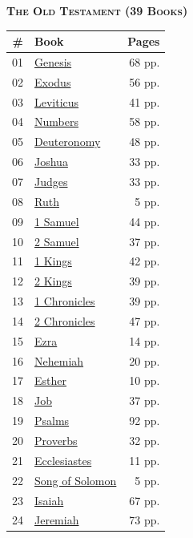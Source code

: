 \documentclass[10pt,letterpaper]{article}
\begin{document}
\begin{minipage}[t]{0.485\textwidth}
\centering
{\bfseries\scshape The Old Testament \footnotesize(39 Books)}\\[0.4em]
\begin{tabularx}{\linewidth}{r X r}
\toprule
\textbf{\#} & \textbf{Book} & \textbf{Pages} \\
\midrule
01 & \href{books/01_Genesis.pdf}{Genesis} & 68 pp. \\
02 & \href{books/02_Exodus.pdf}{Exodus} & 56 pp. \\
03 & \href{books/03_Leviticus.pdf}{Leviticus} & 41 pp. \\
04 & \href{books/04_Numbers.pdf}{Numbers} & 58 pp. \\
05 & \href{books/05_Deuteronomy.pdf}{Deuteronomy} & 48 pp. \\
06 & \href{books/06_Joshua.pdf}{Joshua} & 33 pp. \\
07 & \href{books/07_Judges.pdf}{Judges} & 33 pp. \\
08 & \href{books/08_Ruth.pdf}{Ruth} & 5 pp. \\
09 & \href{books/09_1_Samuel.pdf}{1 Samuel} & 44 pp. \\
10 & \href{books/10_2_Samuel.pdf}{2 Samuel} & 37 pp. \\
11 & \href{books/11_1_Kings.pdf}{1 Kings} & 42 pp. \\
12 & \href{books/12_2_Kings.pdf}{2 Kings} & 39 pp. \\
13 & \href{books/13_1_Chronicles.pdf}{1 Chronicles} & 39 pp. \\
14 & \href{books/14_2_Chronicles.pdf}{2 Chronicles} & 47 pp. \\
15 & \href{books/15_Ezra.pdf}{Ezra} & 14 pp. \\
16 & \href{books/16_Nehemiah.pdf}{Nehemiah} & 20 pp. \\
17 & \href{books/17_Esther.pdf}{Esther} & 10 pp. \\
18 & \href{books/18_Job.pdf}{Job} & 37 pp. \\
19 & \href{books/19_Psalms.pdf}{Psalms} & 92 pp. \\
20 & \href{books/20_Proverbs.pdf}{Proverbs} & 32 pp. \\
21 & \href{books/21_Ecclesiastes.pdf}{Ecclesiastes} & 11 pp. \\
22 & \href{books/22_Song_of_Solomon.pdf}{Song of Solomon} & 5 pp. \\
23 & \href{books/23_Isaiah.pdf}{Isaiah} & 67 pp. \\
24 & \href{books/24_Jeremiah.pdf}{Jeremiah} & 73 pp. \\

\end{tabularx}
\end{minipage}
\end{document}
